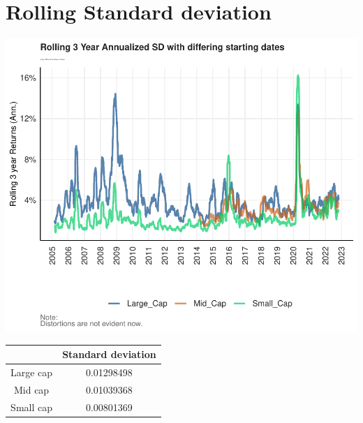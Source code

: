 \documentclass[11pt,preprint, authoryear]{elsarticle}
\let\origfigure\figure
\let\endorigfigure\endfigure
\renewenvironment{figure}[1][2] {
    \expandafter\origfigure\expandafter[H]
} {
    \endorigfigure
}
\let\origtable\table
\let\endorigtable\endtable
\renewenvironment{table}[1][2] {
    \expandafter\origtable\expandafter[H]
} {
    \endorigtable
}
\numberwithin{equation}{section}
\numberwithin{figure}{section}
\numberwithin{table}{section}
\begin{document}
\hypertarget{rolling-standard-deviation}{%
\section{\texorpdfstring{Rolling Standard deviation
\label{Standard deviation}}{Rolling Standard deviation }}\label{rolling-standard-deviation}}

\begin{figure}[H]

{\centering \includegraphics{Volatility-of-Shares_files/figure-latex/Figure8-1} 

}

\caption{Rolling Annualised Standard Deviation of the Indexes \label{Figure8}}\label{fig:Figure8}
\end{figure}

\begin{table}[h]
\begin{center}
    \begin{tabular}{| c | c |}
    \hline
         & Standard deviation \\
        \hline
        Large cap & 0.01298498 \\
        Mid cap & 0.01039368 \\
        Small cap & 0.00801369 \\
        \hline
    \end{tabular}
    \caption{Standard deviation}
    \label{tab:SD}
\end{center}
\end{table}
\end{document}
